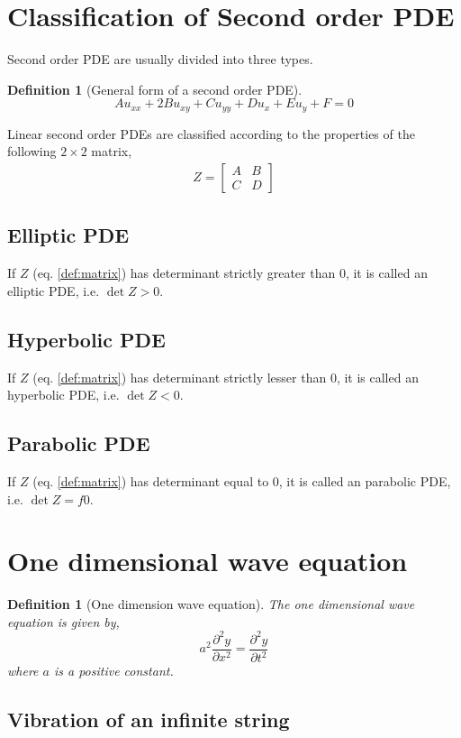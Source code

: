 \documentclass[oneside,11pt,pdftex,final]{book}%
\numberwithin{equation}{section}
\newtheorem{definition}[theorem]{Definition}
\numberwithin{section}{chapter}
\numberwithin{equation}{chapter}
\begin{document}
\section{Classification of Second order PDE}
Second order PDE are usually divided into three types.
\begin{definition}[General form of a second order PDE]
	\[ A u_{xx}+2B u_{xy}+C u_{yy}+Du_x+E u_y +F=0 \]
\end{definition}
Linear second order PDEs are classified according to the properties of the following $ 2\times 2 $ matrix,
\begin{align}\label{def:matrix}
	Z=\begin{bmatrix}
		A & B\\
		C & D
	\end{bmatrix}
\end{align}

\subsection{Elliptic PDE}
If $ Z $ (eq. \ref{def:matrix}) has determinant strictly greater than $ 0 $, it is called an elliptic PDE, i.e. $ \det Z > 0 $.

\subsection{Hyperbolic PDE}
If $ Z $ (eq. \ref{def:matrix}) has determinant strictly lesser than $ 0 $, it is called an hyperbolic PDE, i.e. $ \det Z < 0 $.

\subsection{Parabolic PDE}
If $ Z $ (eq. \ref{def:matrix}) has determinant equal to $ 0 $, it is called an parabolic PDE, i.e. $ \det Z =f 0 $.

\section{One dimensional wave equation}
\begin{definition}[One dimension wave equation]
	The one dimensional wave equation is given by,\[ a^2 \frac{\partial^2y}{\partial x^2}=\frac{\partial^2y}{\partial t^2} \]
	where $ a $ is a positive constant.
\end{definition}

\subsection{Vibration of an infinite string}
\end{document}
